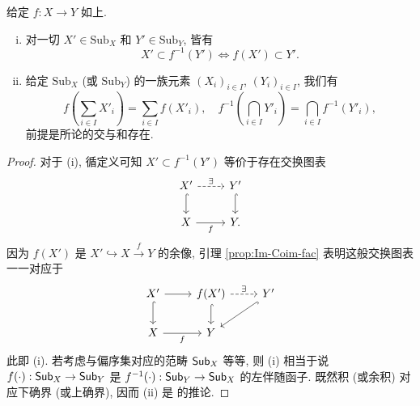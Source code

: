 \begin{lemma}\label{prop:image-sum-preimage-intersection}
	给定 $f: X \to Y$ 如上.
	\begin{enumerate}[(i)]
		\item 对一切 $X' \in \mathrm{Sub}_X$ 和 $Y' \in \mathrm{Sub}_Y$, 皆有
		\[ X' \subset f^{-1}(Y') \iff f(X') \subset Y'. \]
		\item 给定 $\mathrm{Sub}_X$ (或 $\mathrm{Sub}_Y$) 的一族元素 $(X_i)_{i \in I}$, $(Y_i)_{i \in I}$, 我们有
		\[ f\left( \sum_{i \in I} X'_i \right) = \sum_{i \in I} f(X'_i), \quad f^{-1}\left( \bigcap_{i \in I} Y'_i \right) = \bigcap_{i \in I} f^{-1}(Y'_i), \]
		前提是所论的交与和存在.
	\end{enumerate}
\end{lemma}
\begin{proof}
	对于 (i), 循定义可知 $X' \subset f^{-1}(Y')$ 等价于存在交换图表
	\[\begin{tikzcd}
		X' \arrow[dashed, r, "\exists"] \arrow[hookrightarrow, d] & Y' \arrow[hookrightarrow, d] \\
		X \arrow[r, "f"'] & Y .
	\end{tikzcd}\]
	因为 $f(X')$ 是 $X' \hookrightarrow X \xrightarrow{f} Y$ 的余像, 引理 \ref{prop:Im-Coim-fac} 表明这般交换图表一一对应于
	\[\begin{tikzcd}
		X' \arrow[r] \arrow[d, hookrightarrow] & f(X') \arrow[hookrightarrow, d] \arrow[dashed, r, "\exists"] & Y' \arrow[hookrightarrow, ld] \\
		X \arrow[r, "f"'] & Y &
	\end{tikzcd}\]
	此即 (i). 若考虑与偏序集对应的范畴 $\mathsf{Sub}_X$ 等等, 则 (i) 相当于说 $f(\cdot): \mathsf{Sub}_X \to \mathsf{Sub}_Y$ 是 $f^{-1}(\cdot): \mathsf{Sub}_Y \to \mathsf{Sub}_X$ 的左伴随函子. 既然积 (或余积) 对应下确界 (或上确界), 因而 (ii) 是 \cite[定理 2.8.12]{Li1} 的推论.
\end{proof}

